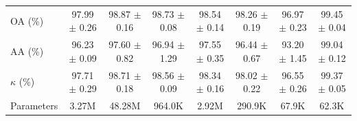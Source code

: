 \begin{table}[htbp]
{\begin{tabular}{l c c c c c c c}
    \midrule
    OA (\%) & 97.99 $\pm$ 0.26 & \textcolor{tgblue}{98.87 $\pm$ 0.16} & \textcolor{tgred}{98.73 $\pm$ 0.08} & 98.54 $\pm$ 0.14 & 98.26 $\pm$ 0.19 & 96.97 $\pm$ 0.23 & \textcolor{tgteal}{99.45 $\pm$ 0.04} \\
    AA (\%) & 96.23 $\pm$ 0.09 & \textcolor{tgblue}{97.60 $\pm$ 0.82} & 96.94 $\pm$ 1.29 & \textcolor{tgred}{97.55 $\pm$ 0.35} & 96.44 $\pm$ 0.67 & 93.20 $\pm$ 1.45 & \textcolor{tgteal}{99.04 $\pm$ 0.12} \\
    $\kappa$ (\%) & 97.71 $\pm$ 0.29 & \textcolor{tgblue}{98.71 $\pm$ 0.18} & \textcolor{tgred}{98.56 $\pm$ 0.09} & 98.34 $\pm$ 0.16 & 98.02 $\pm$ 0.22 & 96.55 $\pm$ 0.26 & \textcolor{tgteal}{99.37 $\pm$ 0.05} \\
    \midrule
    Parameters & 3.27M & 48.28M & 964.0K & 2.92M & 290.9K & 67.9K & 62.3K \\
    \bottomrule
  \end{tabular}%
  }
\end{table}
